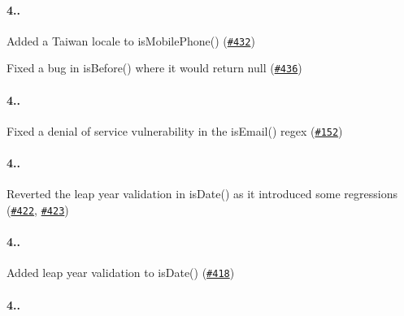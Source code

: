 \paragraph*{4..}


\begin{DoxyItemize}
\item Added a Taiwan locale to {\ttfamily is\+Mobile\+Phone()} (\href{https://github.com/chriso/validator.js/pull/432}{\tt \#432})
\item Fixed a bug in {\ttfamily is\+Before()} where it would return {\ttfamily null} (\href{https://github.com/chriso/validator.js/pull/436}{\tt \#436})
\end{DoxyItemize}

\paragraph*{4..}


\begin{DoxyItemize}
\item Fixed a denial of service vulnerability in the {\ttfamily is\+Email()} regex (\href{https://github.com/chriso/validator.js/issues/152#issuecomment-131874928}{\tt \#152})
\end{DoxyItemize}

\paragraph*{4..}


\begin{DoxyItemize}
\item Reverted the leap year validation in {\ttfamily is\+Date()} as it introduced some regressions (\href{https://github.com/chriso/validator.js/issues/422}{\tt \#422}, \href{https://github.com/chriso/validator.js/issues/423}{\tt \#423})
\end{DoxyItemize}

\paragraph*{4..}


\begin{DoxyItemize}
\item Added leap year validation to {\ttfamily is\+Date()} (\href{https://github.com/chriso/validator.js/pull/418}{\tt \#418})
\end{DoxyItemize}

\paragraph*{4..}


